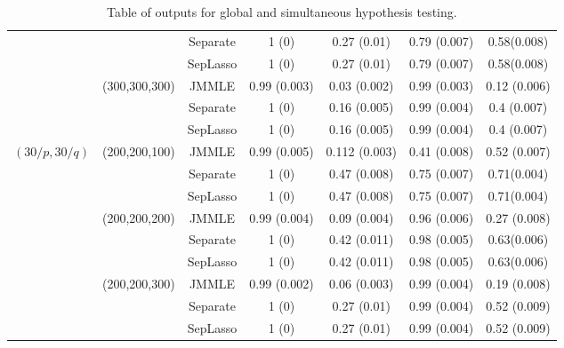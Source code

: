 \begin{table}[t!]
\begin{tabular}{ccccccc}
    ~ & ~         & Separate & 1 (0)          & 0.27 (0.01)    &  0.79 (0.007) & 0.58(0.008)   \\
    ~ & ~         & SepLasso & 1 (0)          & 0.27 (0.01)    &  0.79 (0.007) & 0.58(0.008)    \\\cline{2-7}
    ~ & (300,300,300) & JMMLE    & 0.99 (0.003)  & 0.03 (0.002)   & 0.99 (0.003)   & 0.12 (0.006)  \\
    ~ & ~         & Separate & 1 (0)          & 0.16 (0.005)   & 0.99 (0.004)   & 0.4 (0.007)   \\
    ~ & ~         & SepLasso & 1 (0)          & 0.16 (0.005)   & 0.99 (0.004)  & 0.4 (0.007)     \\\hline
  $(30/p, 30/q)$ & (200,200,100) & JMMLE & 0.99 (0.005)  & 0.112 (0.003)   & 0.41 (0.008)   & 0.52 (0.007)   \\
    ~ & ~         & Separate &  1 (0)         & 0.47 (0.008)   &  0.75 (0.007)  & 0.71(0.004)   \\
    ~ & ~         & SepLasso & 1 (0)          & 0.47 (0.008)   &  0.75 (0.007) & 0.71(0.004)     \\\cline{2-7}
    ~ & (200,200,200) & JMMLE    & 0.99 (0.004)  & 0.09 (0.004)   & 0.96 (0.006)   & 0.27 (0.008)   \\
    ~ & ~         & Separate &  1 (0)         & 0.42 (0.011)   & 0.98 (0.005)   & 0.63(0.006)   \\
    ~ & ~         & SepLasso & 1 (0)          & 0.42 (0.011)   & 0.98 (0.005)  & 0.63(0.006)   \\\cline{2-7}
    ~ & (200,200,300) & JMMLE    & 0.99 (0.002)  &  0.06 (0.003)  & 0.99  (0.004)   & 0.19 (0.008)  \\
    ~ & ~         & Separate & 1 (0)          & 0.27 (0.01)     & 0.99 (0.004)   & 0.52 (0.009)   \\
    ~ & ~         & SepLasso & 1 (0)          & 0.27 (0.01)     & 0.99 (0.004)   & 0.52 (0.009)   \\\hline
    \end{tabular}
    \caption{Table of outputs for global and simultaneous hypothesis testing.}
    \label{table:testingtable}
\end{table}


